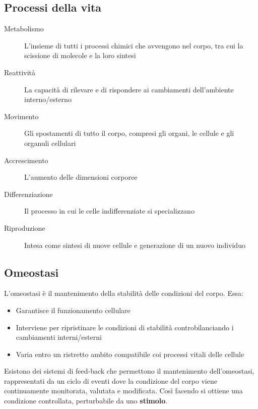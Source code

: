 \documentclass[a4paper]{article}
\begin{document}
\subsection{Processi della vita}
\begin{description}
    \item[Metabolismo] L'insieme di tutti i processi chimici che avvengono nel
    corpo, tra cui la scissione di molecole e la loro sintesi
    \item[Reattività] La capacità di rilevare e di rispondere ai cambiamenti
    dell'ambiente interno/esterno
    \item[Movimento] Gli spostamenti di tutto il corpo, compresi gli organi, le
    cellule e gli organuli cellulari
    \item[Accrescimento] L'aumento delle dimensioni corporee
    \item[Differenziazione] Il processo in cui le celle indifferenziate si
    specializzano
    \item[Riproduzione] Intesa come sintesi di nuove cellule e generazione di
    un nuovo individuo
\end{description}
\subsection{Omeostasi}
L'omeostasi è il mantenimento della stabilità delle condizioni del corpo. 
Essa:
\begin{itemize}
    \item Garantisce il funzionamento cellulare
    \item Interviene per ripristinare le condizioni di stabilità 
    controbilanciando i cambiamenti interni/esterni
    \item Varia entro un ristretto ambito compatibile coi processi vitali delle
    cellule
\end{itemize}
Esistono dei sistemi di feed-back che permettono il mantenimento dell'omeostasi,
rappresentati da un ciclo di eventi dove la condizione del corpo viene 
continuamente monitorata, valutata e modificata. Così facendo si ottiene una
condizione controllata, perturbabile da uno \textbf{stimolo}.
\end{document}
